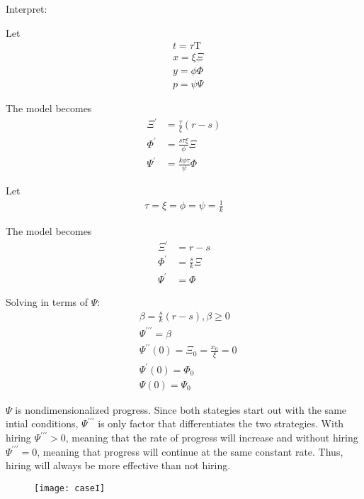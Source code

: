 \documentclass{article}
\newcommand{\Tau}{\mathrm{T}}
\newenvironment{atomize}
    {\begin{list} {} {
            \setlength\itemindent{0pt}
            \setlength\leftmargin{10pt}
            \setlength\labelwidth{0pt}
    }}
    {\end{list}}
\begin{document}
\begin{atomize}
		\item Interpret:
			\begin{atomize}
				\item Let
					\begin{align*}
						&t = \tau \Tau \\[6pt]
						&x = \xi\Xi \\[6pt]
						&y = \phi\Phi \\[6pt]
						&p = \psi\Psi
					\end{align*}
				\item The model becomes
					\begin{align*}
						\Xi^{\prime} &= \frac{\tau}{\xi}(r - s) \\[6pt]
						\Phi^{\prime} &= \frac{s\tau\xi}{\phi}\Xi \\[6pt]
						\Psi^{\prime} &= \frac{k\phi\tau}{\psi}\Phi
					\end{align*}
				\item Let
					\begin{align*}
						\tau = \xi = \phi = \psi = \frac{1}{k}
					\end{align*}
				\item The model becomes
					\begin{align*}
						\Xi^{\prime} &= r - s \\[6pt]
						\Phi^{\prime} &= \frac{s}{k}\Xi \\[6pt]
						\Psi^{\prime} &= \Phi
					\end{align*}
				\item Solving in terms of $\Psi$:
					\begin{align*}
						&\beta = \frac{s}{k}(r-s), \beta \geq 0 \\[6pt]
						&\Psi^{\prime\prime\prime} = \beta \\[6pt]
						&\Psi^{\prime\prime}(0) = \Xi_{0} = \frac{x_{0}}{\xi} = 0 \\[6pt]
						&\Psi^{\prime}(0) = \Phi_{0} \\[6pt]
						&\Psi(0) = \Psi_{0}
					\end{align*}
				\item $\Psi$ is nondimensionalized progress. Since both stategies start
				out with the same intial conditions, $\Psi^{\prime\prime\prime}$ is only
				factor that differentiates the two strategies.  With hiring
				$\Psi^{\prime\prime\prime} > 0$, meaning that the rate of progress will
				increase and without hiring $\Psi^{\prime\prime\prime} = 0$, meaning
				that progress will continue at the same constant rate. Thus, hiring will
				always be more effective than not hiring. 
				\item 
					\begin{figure}[H]
						\centering
						\texttt{[image: caseI]}
					\end{figure}
			\end{atomize}


\end{atomize}
\end{document}
